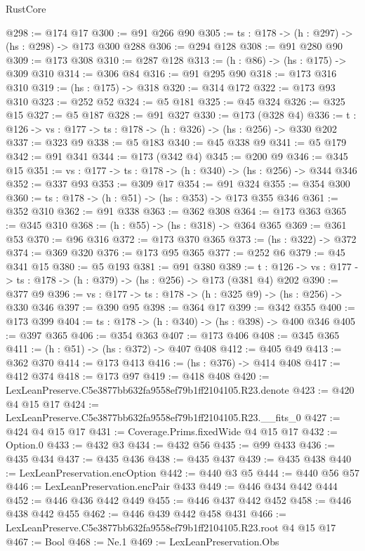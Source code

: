 \begin{lexlean}{RustCore}
\begin{coremodule}
@298 := @174 @17
@300 := @91 @266 @90
@305 := {ts : @178} -> (h : @297) -> (hs : @298) -> @173 @300 @288
@306 := @294 @128
@308 := @91 @280 @90
@309 := @173 @308
@310 := @287 @128
@313 := (h : @86) -> (hs : @175) -> @309 @310
@314 := @306 @84
@316 := @91 @295 @90
@318 := @173 @316 @310
@319 := (hs : @175) -> @318
@320 := @314 @172
@322 := @173 @93 @310
@323 := @252 @52
@324 := @5 @181
@325 := @45 @324
@326 := @325 @15
@327 := @5 @187
@328 := @91 @327
@330 := @173 (@328 @4)
@336 := {t : @126} -> {vs : @177} -> {ts : @178} -> (h : @326) -> (hs : @256) -> @330 @202
@337 := @323 @9
@338 := @5 @183
@340 := @45 @338 @9
@341 := @5 @179
@342 := @91 @341
@344 := @173 (@342 @4)
@345 := @200 @9
@346 := @345 @15
@351 := {vs : @177} -> {ts : @178} -> (h : @340) -> (hs : @256) -> @344 @346
@352 := @337 @93
@353 := @309 @17
@354 := @91 @324
@355 := @354 @300
@360 := {ts : @178} -> (h : @51) -> (hs : @353) -> @173 @355 @346
@361 := @352 @310
@362 := @91 @338
@363 := @362 @308
@364 := @173 @363
@365 := @345 @310
@368 := (h : @55) -> (hs : @318) -> @364 @365
@369 := @361 @53
@370 := @96 @316
@372 := @173 @370 @365
@373 := (hs : @322) -> @372
@374 := @369 @320
@376 := @173 @95 @365
@377 := @252 @6
@379 := @45 @341 @15
@380 := @5 @193
@381 := @91 @380
@389 := {t : @126} -> {vs : @177} -> {ts : @178} -> (h : @379) -> (hs : @256) -> @173 (@381 @4) @202
@390 := @377 @9
@396 := {vs : @177} -> {ts : @178} -> (h : @325 @9) -> (hs : @256) -> @330 @346
@397 := @390 @95
@398 := @364 @17
@399 := @342 @355
@400 := @173 @399
@404 := {ts : @178} -> (h : @340) -> (hs : @398) -> @400 @346
@405 := @397 @365
@406 := @354 @363
@407 := @173 @406
@408 := @345 @365
@411 := (h : @51) -> (hs : @372) -> @407 @408
@412 := @405 @49
@413 := @362 @370
@414 := @173 @413
@416 := (hs : @376) -> @414 @408
@417 := @412 @374
@418 := @173 @97
@419 := @418 @408
@420 := LexLeanPreserve.C5e3877bb632fa9558ef79b1ff2104105.R23.denote
@423 := @420 @4 @15 @17
@424 := LexLeanPreserve.C5e3877bb632fa9558ef79b1ff2104105.R23.__fits_0
@427 := @424 @4 @15 @17
@431 := Coverage.Prims.fixedWide @4 @15 @17
@432 := Option.{0}
@433 := @432 @3
@434 := @432 @56
@435 := @99 @433
@436 := @435 @434
@437 := @435 @436
@438 := @435 @437
@439 := @435 @438
@440 := LexLeanPreservation.encOption
@442 := @440 @3 @5
@444 := @440 @56 @57
@446 := LexLeanPreservation.encPair @433
@449 := @446 @434 @442 @444
@452 := @446 @436 @442 @449
@455 := @446 @437 @442 @452
@458 := @446 @438 @442 @455
@462 := @446 @439 @442 @458 @431
@466 := LexLeanPreserve.C5e3877bb632fa9558ef79b1ff2104105.R23.root @4 @15 @17
@467 := Bool
@468 := Ne.{1}
@469 := LexLeanPreservation.Obs

\end{coremodule}
\end{lexlean}
